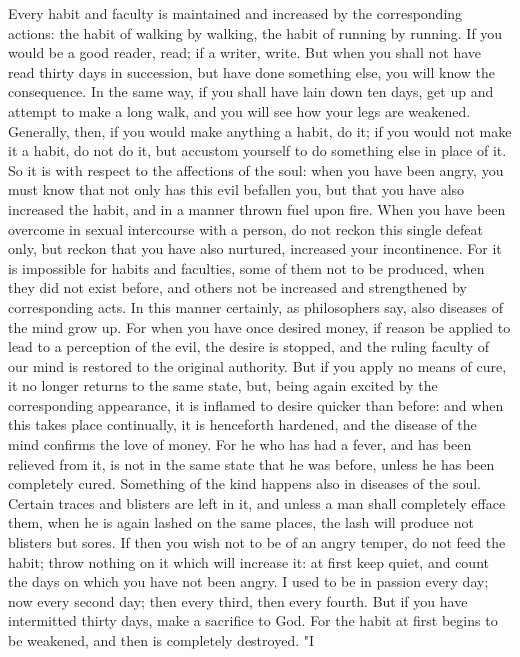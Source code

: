 \documentclass[a4paper]{article}
\begin{document}
    Every habit and faculty is maintained and increased by the corresponding
actions: the habit of walking by walking, the habit of running by running. If
you would be a good reader, read; if a writer, write. But when you shall not
have read thirty days in succession, but have done something else, you will
know the consequence. In the same way, if you shall have lain down ten days,
get up and attempt to make a long walk, and you will see how your legs are
weakened. Generally, then, if you would make anything a habit, do it; if you
would not make it a habit, do not do it, but accustom yourself to do something
else in place of it.
    So it is with respect to the affections of the soul: when you have been
angry, you must know that not only has this evil befallen you, but that you
have also increased the habit, and in a manner thrown fuel upon fire. When you
have been overcome in sexual intercourse with a person, do not reckon this
single defeat only, but reckon that you have also nurtured, increased your
incontinence. For it is impossible for habits and faculties, some of them not
to be produced, when they did not exist before, and others not be increased and
strengthened by corresponding acts.
    In this manner certainly, as philosophers say, also diseases of the mind
grow up. For when you have once desired money, if reason be applied to lead to
a perception of the evil, the desire is stopped, and the ruling faculty of our
mind is restored to the original authority. But if you apply no means of cure,
it no longer returns to the same state, but, being again excited by the
corresponding appearance, it is inflamed to desire quicker than before: and
when this takes place continually, it is henceforth hardened, and the disease
of the mind confirms the love of money. For he who has had a fever, and has
been relieved from it, is not in the same state that he was before, unless he
has been completely cured. Something of the kind happens also in diseases of
the soul. Certain traces and blisters are left in it, and unless a man shall
completely efface them, when he is again lashed on the same places, the lash
will produce not blisters but sores. If then you wish not to be of an angry
temper, do not feed the habit; throw nothing on it which will increase it: at
first keep quiet, and count the days on which you have not been angry. I used
to be in passion every day; now every second day; then every third, then every
fourth. But if you have intermitted thirty days, make a sacrifice to God. For
the habit at first begins to be weakened, and then is completely destroyed. "I
\end{document}
